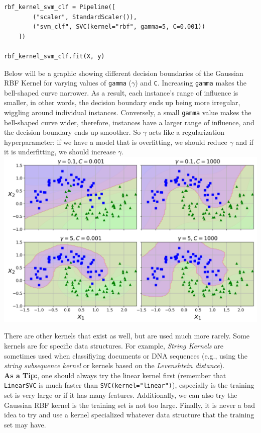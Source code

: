\begin{verbatim}
rbf_kernel_svm_clf = Pipeline([
        ("scaler", StandardScaler()),
        ("svm_clf", SVC(kernel="rbf", gamma=5, C=0.001))
    ])

rbf_kernel_svm_clf.fit(X, y)
\end{verbatim}

\noindent
Below will be a graphic showing different decision boundaries of the Gaussian RBF Kernel for varying values of \texttt{gamma}
($\gamma$) and \texttt{C}. Increasing \texttt{gamma} makes the bell-shaped curve narrower. As a result, each
instance's range of influence is smaller, in other words, the decision boundary ends up being more irregular, wiggling around individual
instances. Conversely, a small \texttt{gamma} value makes the bell-shaped curve wider, therefore, instances have a larger
range of influence, and the decision boundary ends up smoother. So $\gamma$ acts like a regularization hyperparameter: if we have a model
that is overfitting, we should reduce $\gamma$ and if it is underfitting, we should increase $\gamma$. \\

\includegraphics[scale=0.45]{Images/rbfKernel.PNG}

\noindent
There are other kernels that exist as well, but are used much more rarely. Some kernels are for specific data structures. For example, 
\textit{String Kernels} are sometimes used when classifiying documents or DNA sequences (e.g., using the \textit{string subsequence kernel}
or kernels based on the \textit{Levenshtein distance}).\\

\noindent
\textbf{As a Tip:}, one should always try the linear kernel first (remember that \texttt{LinearSVC} is much faster than 
\texttt{SVC(kernel="linear")}), especially is the training set is very large or if it has many features. Additionally, we can 
also try the Gaussian RBF kernel is the training set is not too large. Finally, it is never a bad idea to try and use a kernel specialized
whatever data structure that the training set may have.
